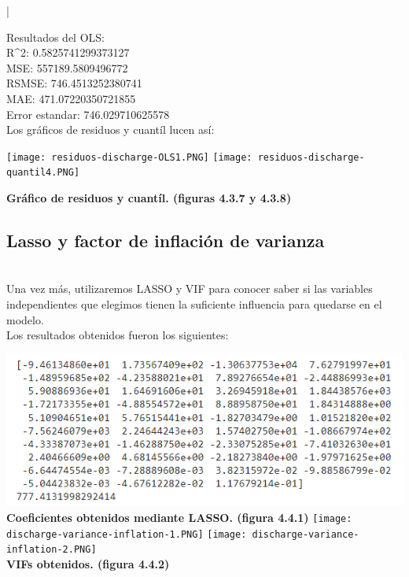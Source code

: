 |\documentclass{article}
\begin{document}
Resultados del OLS:\\
{R^2}:  0.5825741299373127\\
MSE:  557189.5809496772\\
RSMSE:  746.4513252380741\\
MAE:  471.07220350721855\\
Error estandar:  746.029710625578\\


    Los gráficos de residuos y cuantíl lucen así: 

        \texttt{[image: residuos-discharge-OLS1.PNG]} 
        \texttt{[image: residuos-discharge-quantil4.PNG]} \\
        \begin{center}
            \textbf{Gráfico de residuos y cuantíl. (figuras 4.3.7 y 4.3.8)}
        \end{center}


 
\subsection{Lasso y  factor de inflación de varianza}\\

Una vez más, utilizaremos LASSO y VIF para conocer saber si las variables independientes que elegimos tienen la suficiente influencia para quedarse en el modelo.\\

Los resultados obtenidos fueron los siguientes:\\

\begin{center}
        \includegraphics[scale=0.5]{images/lasso-discharge-1.PNG} \\
        \textbf{Coeficientes obtenidos mediante LASSO. (figura 4.4.1)}
        \texttt{[image: discharge-variance-inflation-1.PNG]} 
        \texttt{[image: discharge-variance-inflation-2.PNG]} \\
        \textbf{VIFs obtenidos. (figura 4.4.2)}\\
        
\end{center}        
\end{document}
